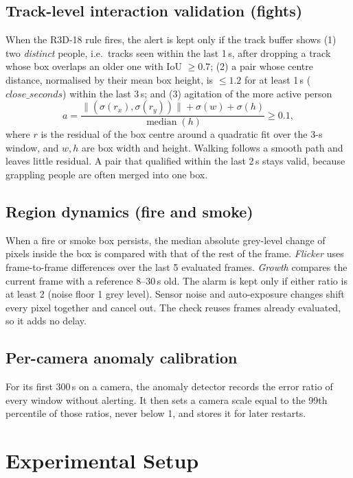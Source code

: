 \documentclass[conference]{IEEEtran}
\begin{document}
\subsection{Track-level interaction validation (fights)}
When the R3D-18 rule fires, the alert is kept only if the track buffer shows (1) two \emph{distinct} people, i.e.\ tracks seen within the last 1\,s, after dropping a track whose box overlaps an older one with IoU $\ge 0.7$; (2) a pair whose centre distance, normalised by their mean box height, is $\le 1.2$ for at least 1\,s ($\mathit{close\_seconds}$) within the last 3\,s; and (3) agitation of the more active person
\begin{equation}
a = \frac{\lVert(\sigma(r_x),\sigma(r_y))\rVert + \sigma(w) + \sigma(h)}{\operatorname{median}(h)} \ge 0.1,
\end{equation}
where $r$ is the residual of the box centre around a quadratic fit over the 3-s window, and $w,h$ are box width and height. Walking follows a smooth path and leaves little residual. A pair that qualified within the last 2\,s stays valid, because grappling people are often merged into one box.

\subsection{Region dynamics (fire and smoke)}
When a fire or smoke box persists, the median absolute grey-level change of pixels inside the box is compared with that of the rest of the frame. \emph{Flicker} uses frame-to-frame differences over the last 5 evaluated frames. \emph{Growth} compares the current frame with a reference 8--30\,s old. The alarm is kept only if either ratio is at least 2 (noise floor 1 grey level). Sensor noise and auto-exposure changes shift every pixel together and cancel out. The check reuses frames already evaluated, so it adds no delay.

\subsection{Per-camera anomaly calibration}
For its first 300\,s on a camera, the anomaly detector records the error ratio of every window without alerting. It then sets a camera scale equal to the 99th percentile of those ratios, never below 1, and stores it for later restarts.

\section{Experimental Setup}
\end{document}
